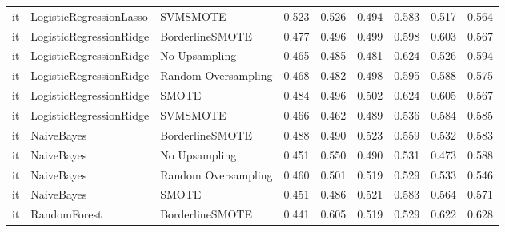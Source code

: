 \begin{tabular}{lllllllll}
      it &      LogisticRegressionLasso &            SVMSMOTE & 0.523 &                     0.526 &                 0.494 &                  0.583 &                                   0.517 &     0.564 \\
      it &      LogisticRegressionRidge &     BorderlineSMOTE & 0.477 &                     0.496 &                 0.499 &                  0.598 &                                   0.603 &     0.567 \\
      it &      LogisticRegressionRidge &       No Upsampling & 0.465 &                     0.485 &                 0.481 &                  0.624 &                                   0.526 &     0.594 \\
      it &      LogisticRegressionRidge & Random Oversampling & 0.468 &                     0.482 &                 0.498 &                  0.595 &                                   0.588 &     0.575 \\
      it &      LogisticRegressionRidge &               SMOTE & 0.484 &                     0.496 &                 0.502 &                  0.624 &                                   0.605 &     0.567 \\
      it &      LogisticRegressionRidge &            SVMSMOTE & 0.466 &                     0.462 &                 0.489 &                  0.536 &                                   0.584 &     0.585 \\
      it &                   NaiveBayes &     BorderlineSMOTE & 0.488 &                     0.490 &                 0.523 &                  0.559 &                                   0.532 &     0.583 \\
      it &                   NaiveBayes &       No Upsampling & 0.451 &                     0.550 &                 0.490 &                  0.531 &                                   0.473 &     0.588 \\
      it &                   NaiveBayes & Random Oversampling & 0.460 &                     0.501 &                 0.519 &                  0.529 &                                   0.533 &     0.546 \\
      it &                   NaiveBayes &               SMOTE & 0.451 &                     0.486 &                 0.521 &                  0.583 &                                   0.564 &     0.571 \\
      it &                 RandomForest &     BorderlineSMOTE & 0.441 &                     0.605 &                 0.519 &                  0.529 &                                   0.622 &     0.628 \\

\end{tabular}
